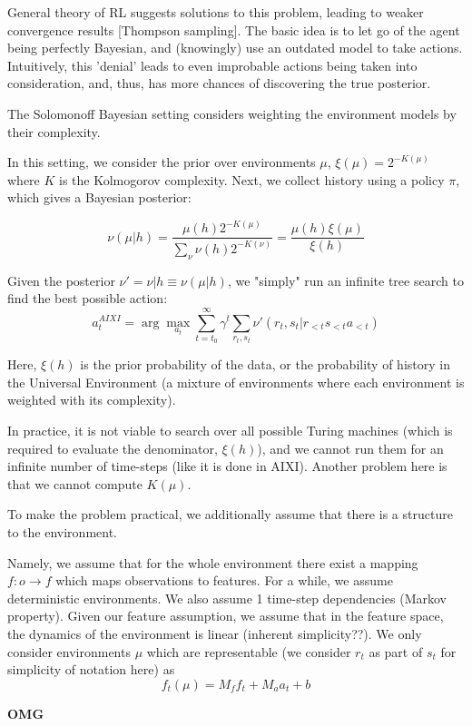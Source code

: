 \documentclass[a4paper,11pt,oneside]{report}
\begin{document}
General theory of RL suggests solutions to this problem, leading to weaker convergence results [Thompson sampling]. The basic idea is to let go of the agent being perfectly Bayesian, and (knowingly) use an outdated model to take actions. Intuitively, this 'denial' leads to even improbable actions being taken into consideration, and, thus, has more chances of discovering the true posterior.

The Solomonoff Bayesian setting considers weighting the environment models by their complexity.

In this setting, we consider the prior over environments $\mu$, $\xi(\mu)=2^{-K(\mu)}$ where $K$ is the Kolmogorov complexity. Next, we collect history using a policy $\pi$, which gives a Bayesian posterior:

$$
\nu(\mu|h)=\frac{\mu(h)2^{-K(\mu)}}{\sum_{\nu}\nu(h)2^{-K(\nu)}}=\frac{\mu(h)\xi(\mu)}{\xi(h)}
$$

Given the posterior $\nu'=\nu|h\equiv \nu(\mu|h)$, we "simply" run an infinite tree search to find the best possible action:
$$
a_t^{AIXI}=\arg\max_{a_t}\sum\limits_{t=t_0}^{\infty}\gamma^t\sum_{r_t,s_t}\nu'(r_t,s_t|r_{<t}s_{<t}a_{<t})
$$

Here, $\xi(h)$ is the prior probability of the data, or the probability of history in the Universal Environment (a mixture of environments where each environment is weighted with its complexity).

In practice, it is not viable to search over all possible Turing machines (which is required to evaluate the denominator, $\xi(h)$), and we cannot run them for an infinite number of time-steps (like it is done in AIXI). Another problem here is that we cannot compute $K(\mu)$.

To make the problem practical, we additionally assume that there is a structure to the environment.

Namely, we assume that for the whole environment there exist a mapping $f\colon o\to f$ which maps observations to features. For a while, we assume deterministic environments. We also assume 1 time-step dependencies (Markov property). Given our feature assumption, we assume that in the feature space, the dynamics of the environment is linear (inherent simplicity??). We only consider environments $\mu$ which are representable (we consider $r_t$ as part of $s_t$ for simplicity of notation here) as
$$
f_t(\mu)=M_ff_t+M_aa_t+b
$$

{\bf OMG}
\end{document}
